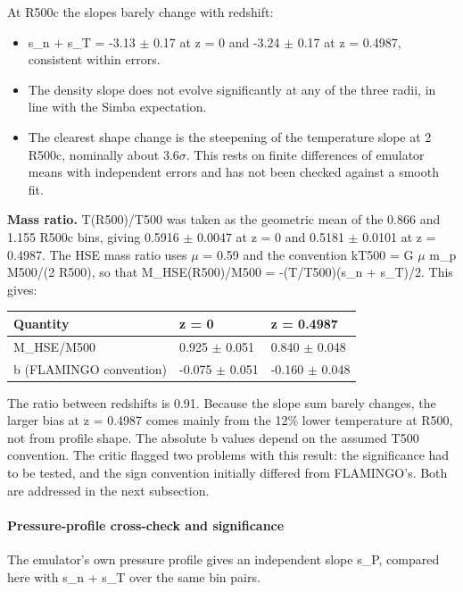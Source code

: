 \documentclass[11pt,a4paper]{article}
\begin{document}
At R500c the slopes barely change with redshift:

\begin{itemize}
  \item s\_n + s\_T = -3.13 $\pm$ 0.17 at z = 0 and -3.24 $\pm$ 0.17 at z = 0.4987, consistent within errors.
  \item The density slope does not evolve significantly at any of the three radii, in line with the Simba expectation.
  \item The clearest shape change is the steepening of the temperature slope at 2 R500c, nominally about 3.6$\sigma$. This rests on finite differences of emulator means with independent errors and has not been checked against a smooth fit.
\end{itemize}
\textbf{Mass ratio.} T(R500)/T500 was taken as the geometric mean of the 0.866 and 1.155 R500c bins, giving 0.5916 $\pm$ 0.0047 at z = 0 and 0.5181 $\pm$ 0.0101 at z = 0.4987. The HSE mass ratio uses $\mu$ = 0.59 and the convention kT500 = G $\mu$ m\_p M500/(2 R500), so that M\_HSE(R500)/M500 = -(T/T500)(s\_n + s\_T)/2. This gives:

\begin{longtable}{@{}p{}p{}p{}@{}}
\toprule
\textbf{Quantity} & \textbf{z = 0} & \textbf{z = 0.4987} \\ \midrule \endhead
M\_HSE/M500 & 0.925 $\pm$ 0.051 & 0.840 $\pm$ 0.048 \\
b (FLAMINGO convention) & -0.075 $\pm$ 0.051 & -0.160 $\pm$ 0.048 \\
\bottomrule\end{longtable}
The ratio between redshifts is 0.91. Because the slope sum barely changes, the larger bias at z = 0.4987 comes mainly from the 12\% lower temperature at R500, not from profile shape. The absolute b values depend on the assumed T500 convention. The critic flagged two problems with this result: the significance had to be tested, and the sign convention initially differed from FLAMINGO's. Both are addressed in the next subsection.

\paragraph{Pressure-profile cross-check and significance}
The emulator's own pressure profile gives an independent slope s\_P, compared here with s\_n + s\_T over the same bin pairs.
\end{document}
